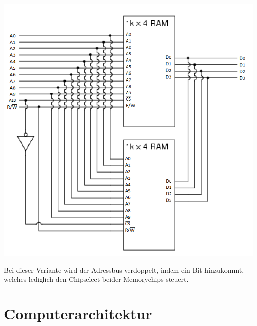 \documentclass[a4paper,10pt]{report}
\begin{document}
\begin{enumerate}
\begin{center}
\includegraphics[scale=0.75]{imgs/MemoryArray1.png}
\end{center}
\end{enumerate}
Bei dieser Variante wird der Adressbus verdoppelt, indem ein Bit hinzukommt, welches lediglich den Chipselect beider Memorychips steuert. 
\newpage
\chapter{Computerarchitektur}
\end{document}
